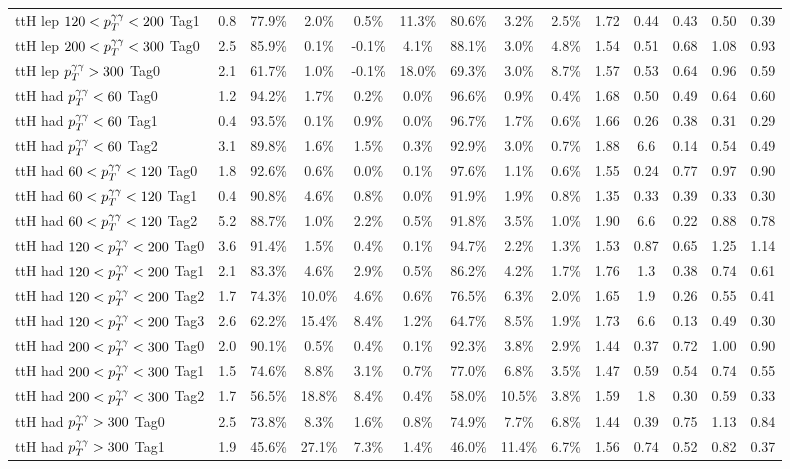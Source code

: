 \begin{tabular}{l|ccccccccc|c|ccc}
     ttH lep $120<p_T^{\gamma\gamma}<200$ Tag1 & 0.8 & 77.9\% & 2.0\% & 0.5\% & 11.3\% & 80.6\% & 3.2\% & 2.5\% & 1.72 & 0.44 & 0.43 & 0.50 & 0.39 \\
     [\cmsTabSkip]
     ttH lep $200<p_T^{\gamma\gamma}<300$ Tag0 & 2.5 & 85.9\% & 0.1\% & -0.1\% & 4.1\% & 88.1\% & 3.0\% & 4.8\% & 1.54 & 0.51 & 0.68 & 1.08 & 0.93 \\
     [\cmsTabSkip]
     ttH lep $p_T^{\gamma\gamma}>300$ Tag0 & 2.1 & 61.7\% & 1.0\% & -0.1\% & 18.0\% & 69.3\% & 3.0\% & 8.7\% & 1.57 & 0.53 & 0.64 & 0.96 & 0.59 \\
     [\cmsTabSkip]
     ttH had $p_T^{\gamma\gamma}<60$ Tag0 & 1.2 & 94.2\% & 1.7\% & 0.2\% & 0.0\% & 96.6\% & 0.9\% & 0.4\% & 1.68 & 0.50 & 0.49 & 0.64 & 0.60 \\
     ttH had $p_T^{\gamma\gamma}<60$ Tag1 & 0.4 & 93.5\% & 0.1\% & 0.9\% & 0.0\% & 96.7\% & 1.7\% & 0.6\% & 1.66 & 0.26 & 0.38 & 0.31 & 0.29 \\
     ttH had $p_T^{\gamma\gamma}<60$ Tag2 & 3.1 & 89.8\% & 1.6\% & 1.5\% & 0.3\% & 92.9\% & 3.0\% & 0.7\% & 1.88 & 6.6 & 0.14 & 0.54 & 0.49 \\
     [\cmsTabSkip]
     ttH had $60<p_T^{\gamma\gamma}<120$ Tag0 & 1.8 & 92.6\% & 0.6\% & 0.0\% & 0.1\% & 97.6\% & 1.1\% & 0.6\% & 1.55 & 0.24 & 0.77 & 0.97 & 0.90 \\
     ttH had $60<p_T^{\gamma\gamma}<120$ Tag1 & 0.4 & 90.8\% & 4.6\% & 0.8\% & 0.0\% & 91.9\% & 1.9\% & 0.8\% & 1.35 & 0.33 & 0.39 & 0.33 & 0.30 \\
     ttH had $60<p_T^{\gamma\gamma}<120$ Tag2 & 5.2 & 88.7\% & 1.0\% & 2.2\% & 0.5\% & 91.8\% & 3.5\% & 1.0\% & 1.90 & 6.6 & 0.22 & 0.88 & 0.78 \\
     [\cmsTabSkip]
     ttH had $120<p_T^{\gamma\gamma}<200$ Tag0 & 3.6 & 91.4\% & 1.5\% & 0.4\% & 0.1\% & 94.7\% & 2.2\% & 1.3\% & 1.53 & 0.87 & 0.65 & 1.25 & 1.14 \\
     ttH had $120<p_T^{\gamma\gamma}<200$ Tag1 & 2.1 & 83.3\% & 4.6\% & 2.9\% & 0.5\% & 86.2\% & 4.2\% & 1.7\% & 1.76 & 1.3 & 0.38 & 0.74 & 0.61 \\
     ttH had $120<p_T^{\gamma\gamma}<200$ Tag2 & 1.7 & 74.3\% & 10.0\% & 4.6\% & 0.6\% & 76.5\% & 6.3\% & 2.0\% & 1.65 & 1.9 & 0.26 & 0.55 & 0.41 \\
     ttH had $120<p_T^{\gamma\gamma}<200$ Tag3 & 2.6 & 62.2\% & 15.4\% & 8.4\% & 1.2\% & 64.7\% & 8.5\% & 1.9\% & 1.73 & 6.6 & 0.13 & 0.49 & 0.30 \\
     [\cmsTabSkip]
     ttH had $200<p_T^{\gamma\gamma}<300$ Tag0 & 2.0 & 90.1\% & 0.5\% & 0.4\% & 0.1\% & 92.3\% & 3.8\% & 2.9\% & 1.44 & 0.37 & 0.72 & 1.00 & 0.90 \\
     ttH had $200<p_T^{\gamma\gamma}<300$ Tag1 & 1.5 & 74.6\% & 8.8\% & 3.1\% & 0.7\% & 77.0\% & 6.8\% & 3.5\% & 1.47 & 0.59 & 0.54 & 0.74 & 0.55 \\
     ttH had $200<p_T^{\gamma\gamma}<300$ Tag2 & 1.7 & 56.5\% & 18.8\% & 8.4\% & 0.4\% & 58.0\% & 10.5\% & 3.8\% & 1.59 & 1.8 & 0.30 & 0.59 & 0.33 \\
     [\cmsTabSkip]
     ttH had $p_T^{\gamma\gamma}>300$ Tag0 & 2.5 & 73.8\% & 8.3\% & 1.6\% & 0.8\% & 74.9\% & 7.7\% & 6.8\% & 1.44 & 0.39 & 0.75 & 1.13 & 0.84 \\
     ttH had $p_T^{\gamma\gamma}>300$ Tag1 & 1.9 & 45.6\% & 27.1\% & 7.3\% & 1.4\% & 46.0\% & 11.4\% & 6.7\% & 1.56 & 0.74 & 0.52 & 0.82 & 0.37 \\
     [\cmsTabSkip]
\end{tabular}
